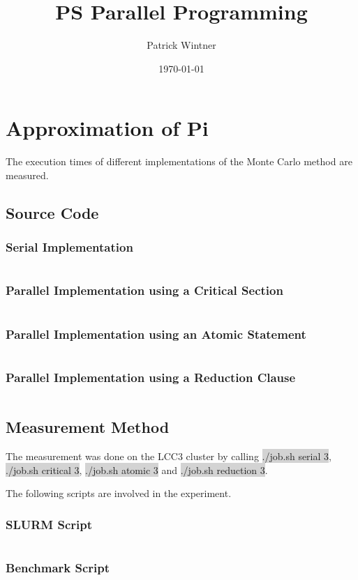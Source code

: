 \documentclass[parskip]{scrartcl}
\title{PS Parallel Programming}
\author{Patrick Wintner}
\date{\today}
\begin{document}
	\maketitle
	
	\section{Approximation of Pi}
	The execution times of different implementations of the Monte Carlo method are measured.
	\subsection{Source Code}
	\subsubsection{Serial Implementation}
	\inputminted	[linenos]{c}{ex1/serial.c}
	\subsubsection{Parallel Implementation using a Critical Section}
	\inputminted	[linenos]{c}{ex1/critical.c}
	\subsubsection{Parallel Implementation using an Atomic Statement}
	\inputminted	[linenos]{c}{ex1/atomic.c}
	\subsubsection{Parallel Implementation using a Reduction Clause}
	\inputminted	[linenos]{c}{ex1/reduction.c}
	\subsection{Measurement Method}
	The measurement was done on the LCC3 cluster by calling \colorbox{lightgray}{./job.sh serial 3}, \colorbox{lightgray}{./job.sh critical 3}, \colorbox{lightgray}{./job.sh atomic 3} and \colorbox{lightgray}{./job.sh reduction 3}.
	
	The following scripts are involved in the experiment.
	\subsubsection{SLURM Script}
	\inputminted[linenos]{bash}{ex1/job.sh}
	\subsubsection{Benchmark Script}
	\inputminted[linenos]{bash}{ex1/benchmark.sh}
	
\end{document}

